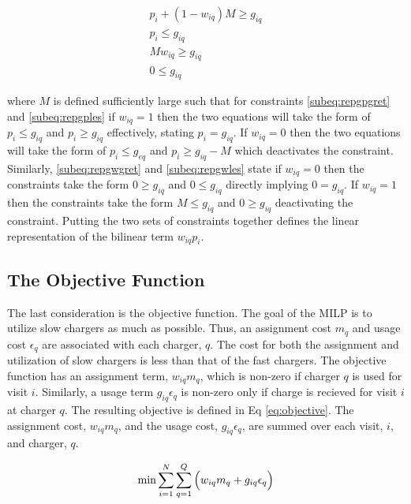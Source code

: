 \documentclass[letterpaper, 10pt, conference]{IEEEtran}
\begin{document}
\begin{subequations}
\begin{align}
    p_i + (1 - w_{iq})M \geq g_{iq}  \label{subeq:repgpgret} \\
    p_i \leq g_{iq}                 \label{subeq:repgples} \\
    Mw_{iq} \geq g_{iq}              \label{subeq:repgwgret} \\
    0 \leq g_{iq}                   \label{subeq:repgwles}
\end{align}
\end{subequations}

\noindent
where $M$ is defined sufficiently large such that for constraints \eqref{subeq:repgpgret} and \eqref{subeq:repgples} if
$w_{iq} = 1$ then the two equations will take the form of $p_i \leq g_{iq}$ and $p_i \geq g_{iq}$ effectively, stating $p_i =
g_{iq}$. If $w_{iq} = 0$ then the two equations will take the form of $p_i \leq g_{eq}$ and $p_i \geq g_{iq} - M$ which
deactivates the constraint. Similarly, \eqref{subeq:repgwgret} and \eqref{subeq:repgwles} state if $w_{iq} = 0$ then the
constraints take the form $0 \geq g_{iq}$ and $0 \leq g_{iq}$ directly implying $0 = g_{iq}$. If $w_{iq} = 1$ then the
constraints take the form $M \leq g_{iq}$ and $0 \geq g_{iq}$ deactivating the constraint. Putting the two sets of constraints
together defines the linear representation of the bilinear term $w_{iq} p_i$.

\subsection{The Objective Function} \label{sec:objective-function}
The last consideration is the objective function. The goal of the MILP is to utilize slow chargers as much as possible.
Thus, an assignment cost $m_q$ and usage cost $\epsilon_q$ are associated with each charger, $q$. The cost for both the
assignment and utilization of slow chargers is less than that of the fast chargers. The objective function has an
assignment term, $w_{iq}m_q$, which is non-zero if charger $q$ is used for visit $i$. Similarly, a usage term $g_{iq}
\epsilon_q$ is non-zero only if charge is recieved for visit $i$ at charger $q$. The resulting objective is defined in Eq
\ref{eq:objective}. The assignment cost, $w_{iq}m_q$, and the usage cost, $g_{iq}\epsilon_q$, are summed over each visit, $i$,
and charger, $q$.

\begin{equation}
\label{eq:objective}
	\min \sum_{i=1}^N \sum_{q=1}^Q \Big( w_{iq} m_q + g_{iq} \epsilon_q \Big) \\
\end{equation}
\end{document}
